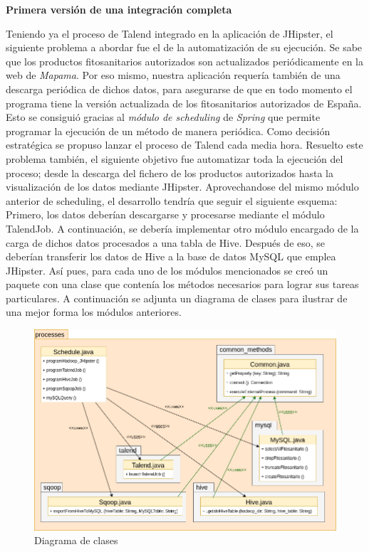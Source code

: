 \par 
\textbf{Primera versión de una integración completa}
\par
Teniendo ya el proceso de Talend integrado en la aplicación de JHipster, el siguiente problema a abordar fue el de la automatización de su ejecución. Se sabe que los productos fitosanitarios autorizados son actualizados periódicamente en la web de \textit{Mapama}. Por eso mismo, nuestra aplicación requería también de una descarga periódica de dichos datos, para asegurarse de que en todo momento el programa tiene la versión actualizada de los fitosanitarios autorizados de España. Esto se consiguió gracias al \textit{módulo de scheduling}\cite{spring_scheduling} de \textit{Spring} que permite programar la ejecución de un método de manera periódica. Como decisión estratégica se propuso lanzar el proceso de Talend cada media hora. Resuelto este problema también, el siguiente objetivo fue automatizar toda la ejecución del proceso; desde la descarga del fichero de los productos autorizados hasta la visualización de los datos mediante JHipster. Aprovechandose del mismo módulo anterior de scheduling, el desarrollo tendría que seguir el siguiente esquema: Primero, los datos deberían descargarse y procesarse mediante el módulo TalendJob. A continuación, se debería implementar otro módulo encargado de la carga de dichos datos procesados a una tabla de Hive. Después de eso, se deberían transferir los datos de Hive a la base de datos MySQL que emplea JHipster. Así pues, para cada uno de los módulos mencionados se creó un paquete con una clase que contenía los métodos necesarios para lograr sus tareas particulares. A continuación se adjunta un diagrama de clases para ilustrar de una mejor forma los módulos anteriores.


\begin{figure}[H]
    \centering
    \includegraphics[width=1\textwidth]{Imagenes/Paquete_processes}
    \caption{Diagrama de clases}
    \label{fig:diag_clases}
\end{figure}
\par

